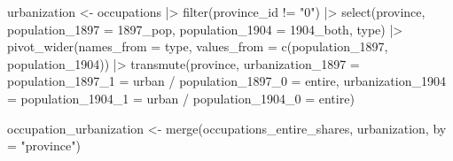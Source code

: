\documentclass[
  9pt,
  letterpaper,
  DIV=11,
  numbers=noendperiod]{scrartcl}
\newenvironment{Shaded}{\begin{snugshade}}{\end{snugshade}}
\newcommand{\AttributeTok}[1]{\textcolor[rgb]{0.16,0.50,0.73}{#1}}
\newcommand{\FunctionTok}[1]{\textcolor[rgb]{0.56,0.27,0.68}{#1}}
\newcommand{\NormalTok}[1]{\textcolor[rgb]{0.81,0.81,0.76}{#1}}
\newcommand{\OtherTok}[1]{\textcolor[rgb]{0.15,0.68,0.38}{#1}}
\newcommand{\SpecialCharTok}[1]{\textcolor[rgb]{0.24,0.68,0.91}{#1}}
\newcommand{\StringTok}[1]{\textcolor[rgb]{0.96,0.31,0.31}{#1}}
\begin{document}
\begin{Shaded}
\begin{Highlighting}[]
\NormalTok{urbanization }\OtherTok{\textless{}{-}}\NormalTok{ occupations }\SpecialCharTok{|\textgreater{}} 
  \FunctionTok{filter}\NormalTok{(province\_id }\SpecialCharTok{!=} \StringTok{"0"}\NormalTok{) }\SpecialCharTok{|\textgreater{}} 
  \FunctionTok{select}\NormalTok{(province, }\AttributeTok{population\_1897 =} \StringTok{\textasciigrave{}}\AttributeTok{1897\_pop}\StringTok{\textasciigrave{}}\NormalTok{, }
         \AttributeTok{population\_1904 =} \StringTok{\textasciigrave{}}\AttributeTok{1904\_both}\StringTok{\textasciigrave{}}\NormalTok{, type) }\SpecialCharTok{|\textgreater{}} 
  \FunctionTok{pivot\_wider}\NormalTok{(}\AttributeTok{names\_from =}\NormalTok{ type, }
              \AttributeTok{values\_from =} \FunctionTok{c}\NormalTok{(population\_1897, population\_1904)) }\SpecialCharTok{|\textgreater{}} 
  \FunctionTok{transmute}\NormalTok{(province,}
            \AttributeTok{urbanization\_1897 =} \StringTok{\textasciigrave{}}\AttributeTok{population\_1897\_1 = urban}\StringTok{\textasciigrave{}} \SpecialCharTok{/} 
              \StringTok{\textasciigrave{}}\AttributeTok{population\_1897\_0 = entire}\StringTok{\textasciigrave{}}\NormalTok{,}
            \AttributeTok{urbanization\_1904 =} \StringTok{\textasciigrave{}}\AttributeTok{population\_1904\_1 = urban}\StringTok{\textasciigrave{}} \SpecialCharTok{/} 
              \StringTok{\textasciigrave{}}\AttributeTok{population\_1904\_0 = entire}\StringTok{\textasciigrave{}}\NormalTok{)}

\NormalTok{occupation\_urbanization }\OtherTok{\textless{}{-}} \FunctionTok{merge}\NormalTok{(occupations\_entire\_shares, urbanization, }
                                 \AttributeTok{by =} \StringTok{"province"}\NormalTok{)}
\end{Highlighting}
\end{Shaded}
\end{document}
